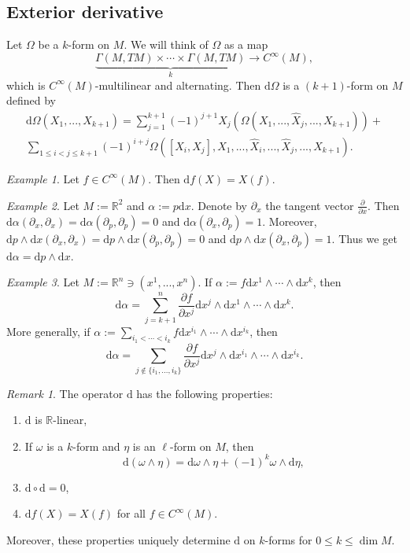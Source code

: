 \documentclass[11pt]{amsart}
\numberwithin{equation}{section}
\theoremstyle{plain}
\theoremstyle{definition}
\theoremstyle{remark}
\newtheorem{rem}{Remark}[subsection]
\newtheorem{ex}{Example}[subsection]
\newcommand{\R}{\mathbb{R}}
\newcommand{\dd}{{\mathrm{d}}}
\begin{document}
\subsection{Exterior derivative}
Let $\Omega$ be a $k$-form on $M$. We will think of $\Omega$ as a map $$\underbrace{\Gamma(M,TM)\times\dotsm \times \Gamma(M,TM)}_{k}\to C^\infty(M),$$ which is $C^\infty(M)$-multilinear and alternating. Then $\dd \Omega$ is a $(k+1)$-form on $M$ defined by 
\begin{multline*}
\dd\Omega(X_1,...,X_{k+1})=\sum_{j=1}^{k+1}(-1)^{j+1}X_j(\Omega(X_1,...,\widehat{X}_j,...,X_{k+1}))+\\\sum_{1\leq i<j\leq k+1}(-1)^{i+j}\Omega([X_i,X_j],X_1,...,\widehat{X}_i,...,\widehat{X}_j,...,X_{k+1}).
\end{multline*}

\begin{ex}
Let $f\in C^\infty(M)$. Then $\dd f(X)=X(f)$.
\end{ex}

\begin{ex}
Let $M:=\R^2$ and $\alpha:=p\dd x$. Denote by $\partial_x$ the tangent vector $\frac{\partial}{\partial x}$.
Then $\dd\alpha(\partial_{x},\partial_x)=\dd\alpha(\partial_p,\partial_p)=0$ and $\dd\alpha(\partial_x,\partial_p)=1$. Moreover, $\dd p\land\dd x(\partial_x,\partial_x)=\dd p\land\dd x(\partial_p,\partial_p)=0$ and $\dd p\land\dd x(\partial_x,\partial_p)=1$. Thus we get $\dd\alpha=\dd p\land\dd x$.
\end{ex}

\begin{ex}
Let $M:=\R^n\ni(x^1,...,x^n)$. If $\alpha:=f\dd x^1\land\dotsm \land \dd x^k$, then $$\dd\alpha=\sum_{j=k+1}^n\frac{\partial f}{\partial x^j}\dd x^j\land \dd x^1\land\dotsm\land \dd x^k.$$ More generally, if $\alpha:=\sum_{i_1<\dotsm <i_k}f\dd x^{i_1}\land\dotsm \land \dd x^{i_k}$, then $$\dd\alpha=\sum_{j\not\in\{i_1,...,i_k\}}\frac{\partial f}{\partial x^j}\dd x^j\land \dd x^{i_1}\land\dotsm\land \dd x^{i_k}.$$
\end{ex}

\begin{rem}
The operator $\dd$ has the following properties:
\begin{enumerate}
\item{$\dd$ is $\R$-linear,}
\item{If $\omega$ is a $k$-form and $\eta$ is an $\ell$-form on $M$, then $$\dd(\omega\land\eta)=\dd\omega\land\eta+(-1)^k\omega\land \dd\eta,$$
}
\item{$\dd\circ \dd=0$,}
\item{$\dd f(X)=X(f)$ for all $f\in C^\infty(M)$.}
\end{enumerate}
Moreover, these properties uniquely determine $\dd$ on $k$-forms for $0\leq k\leq \dim M$.
\end{rem}
\end{document}
